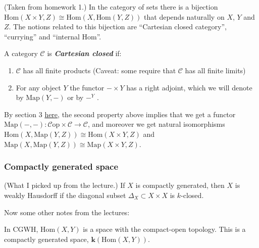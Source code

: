 (Taken from homework 1.) In the category of sets there is a bijection
$\text{Hom}(X\times Y, Z)\cong \text{Hom}(X, \text{Hom}(Y, Z))$ that depends naturally on $X$, $Y$
and $Z$. The notions related to this bijection are “Cartesian closed category”,
“currying” and “internal Hom”.

\begin{definition}
A category $\mathcal{C}$ is \textbf{\textit{Cartesian closed}} if:
\begin{enumerate}
\item $\mathcal{C}$ has all finite products (Caveat: some require that $\mathcal{C}$ has all finite limits)
\item For any object $Y$ the functor $- \times Y$ has a right adjoint, which we will denote by $\text{Map}(Y,-)$ or by $-^Y$ .
\end{enumerate}
\end{definition}
\begin{remark}
By section 3 \href{https://ncatlab.org/nlab/show/internal+hom }{here}, the
second property above implies that we get a functor $\text{Map}(-,-) :
\mathcal{C}{\text{op}}
\times \mathcal{C} \to \mathcal{C}$, and moreover we get natural isomorphisms
$\text{Hom}(X, \text{Map}(Y,
Z)) \cong \text{Hom}(X \times Y, Z)$ and $\text{Map}(X, \text{Map}(Y, Z))\cong
\text{Map}(X \times Y,
Z)$.
\end{remark}

\subsubsection{Compactly generated space}

(What I picked up from the lecture.) If $X$ is compactly generated, then $X$ is
weakly Hausdorff if the diagonal subset $\Delta_X\subset X\times X$ is
{\color{orange}$k$-closed}.

Now some other notes from the lectures:
	
In $\text{CGWH}$, $\text{Hom}(X,Y)$ is a space with the compact-open topology.
This is a compactly generated space, $\mathbf{k}(\text{Hom}(X,Y))$.

